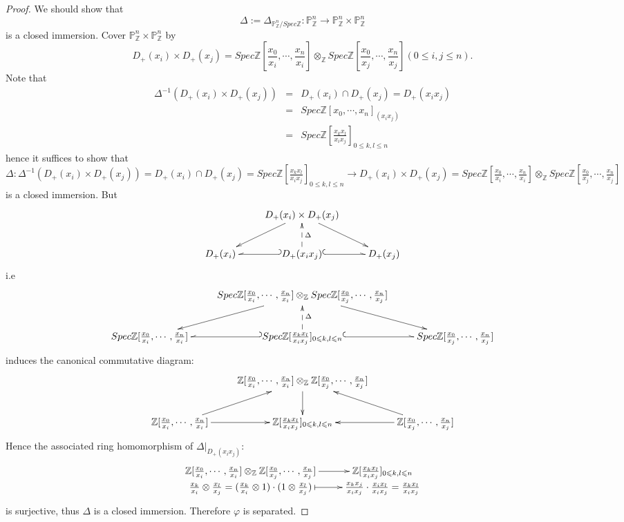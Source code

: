 \begin{proof}
We should show that
$$\Delta:=\Delta_{\mathbb{P}_{\mathbb{Z}}^n/Spec\mathbb{Z}}:
\mathbb{P}_{\mathbb{Z}}^n\rightarrow \mathbb{P}_{\mathbb{Z}}^n\times
\mathbb{P}_{\mathbb{Z}}^n$$ is a closed immersion. Cover
$\mathbb{P}_{\mathbb{Z}}^n\times \mathbb{P}_{\mathbb{Z}}^n$ by
$$D_+(x_i)\times
D_+(x_j)=Spec\mathbb{Z}[\frac{x_0}{x_i},\cdots,\frac{x_n}{x_i}]\otimes_{\mathbb{Z}}
Spec\mathbb{Z}[\frac{x_0}{x_j},\cdots,\frac{x_n}{x_j}](0\leqslant
i,j\leqslant n).$$ Note that
\begin{eqnarray*}
\Delta^{-1}(D_+(x_i)\times D_+(x_j)) & = & D_+(x_i)\cap
D_+(x_j)=D_+(x_ix_j)                                 \\
& = & Spec\mathbb{Z}[x_0,\cdots,x_n]_{(x_ix_j)}      \\
& = & Spec\mathbb{Z}[\frac{x_kx_l}{x_ix_j}]_{0\leqslant k,l\leqslant
n}
\end{eqnarray*}
hence it suffices to show that
$\Delta:\Delta^{-1}(D_+(x_i)\times D_+(x_j))=D_+(x_i)\cap
D_+(x_j)=Spec\mathbb{Z}[\frac{x_kx_l}{x_ix_j}]_{0\leqslant
k,l\leqslant n}\rightarrow D_+(x_i)\times
D_+(x_j)=Spec\mathbb{Z}[\frac{x_0}{x_i},\cdots,\frac{x_n}{x_i}]\otimes_{\mathbb{Z}}
Spec\mathbb{Z}[\frac{x_0}{x_j},\cdots,\frac{x_n}{x_j}]$ is a closed
immersion. But
\[ \xymatrix{
   & {D_+(x_i)\times D_+(x_j)} \ar[dl] \ar[dr]               \\
   {D_+(x_i)} & {D_+(x_ix_j)} \ar@_{(->}[l] \ar@^{(->}[r]
   \ar@{-->}[u]_{\Delta} & {D_+(x_j)} }  \]
i.e
\[ \xymatrix{
   & {Spec\mathbb{Z}[\frac{x_0}{x_i},\cdots,\frac{x_n}{x_i}]\otimes_{\mathbb{Z}}Spec\mathbb{Z}
   [\frac{x_0}{x_j},\cdots,\frac{x_n}{x_j}]} \ar[dl] \ar[dr]               \\
   {Spec\mathbb{Z}[\frac{x_0}{x_i},\cdots,\frac{x_n}{x_i}]} &
   {Spec\mathbb{Z}[\frac{x_kx_l}{x_ix_j}]_{0\leqslant k,l\leqslant n}} \ar@_{(->}[l] \ar@^{(->}[r]
   \ar@{-->}[u]_{\Delta} & {Spec\mathbb{Z}[\frac{x_0}{x_j},\cdots,\frac{x_n}{x_j}]} }  \]
induces the canonical commutative diagram:
\[ \xymatrix{
   & {\mathbb{Z}[\frac{x_0}{x_i},\cdots,\frac{x_n}{x_i}]\otimes_{\mathbb{Z}}\mathbb{Z}
   [\frac{x_0}{x_j},\cdots,\frac{x_n}{x_j}]} \ar[d]                  \\
   {\mathbb{Z}[\frac{x_0}{x_i},\cdots,\frac{x_n}{x_i}]} \ar[ur] \ar[r] &
   {\mathbb{Z}[\frac{x_kx_l}{x_ix_j}]_{0\leqslant k,l\leqslant n}} &
   {\mathbb{Z}[\frac{x_0}{x_j},\cdots,\frac{x_n}{x_j}]} \ar[l] \ar[ul] }  \]
Hence the associated ring homomorphism of
$\left.\Delta\right|_{D_+(x_ix_j)}$:
\[ \xymatrix@R=-0.25em{
   {\mathbb{Z}[\frac{x_0}{x_i},\cdots,\frac{x_n}{x_i}]\otimes_{\mathbb{Z}}\mathbb{Z}
   [\frac{x_0}{x_j},\cdots,\frac{x_n}{x_j}]} \ar[r] &
   {\mathbb{Z}[\frac{x_kx_l}{x_ix_j}]_{0\leqslant k,l\leqslant n}}  \\
   {\frac{x_k}{x_i}\otimes\frac{x_l}{x_j}=(\frac{x_k}{x_i}\otimes1)\cdot(1\otimes\frac{x_l}{x_j})} \ar@{|->}[r] &
   {\frac{x_kx_j}{x_ix_j}\cdot\frac{x_ix_l}{x_ix_j}=\frac{x_kx_l}{x_ix_j}} }  \]
is surjective, thus $\Delta$ is a closed immersion. Therefore
$\varphi$ is separated.


\end{proof}
